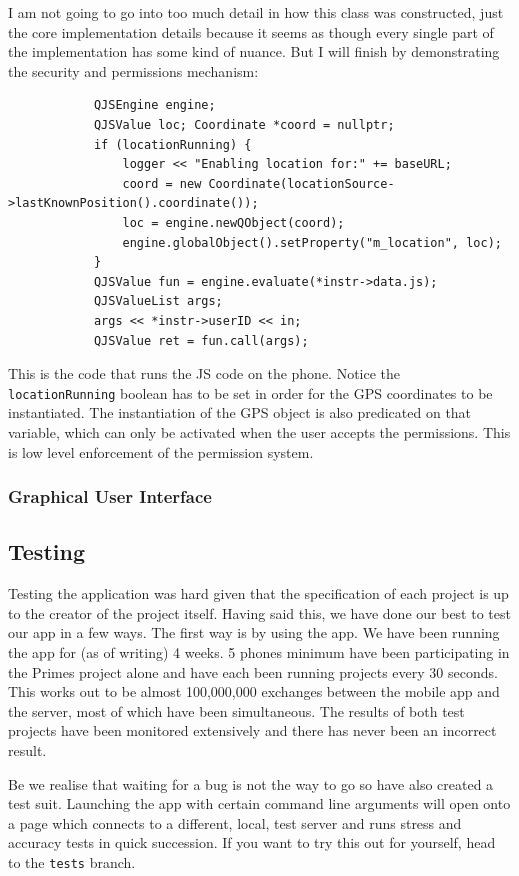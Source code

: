 \documentclass{article}
\begin{document}
I am not going to go into too much detail in how this class was constructed, just the core implementation details because it seems
as though every single part of the implementation has some kind of nuance. But I will finish by demonstrating the security and permissions
mechanism:
\begin{verbatim}
            QJSEngine engine;
            QJSValue loc; Coordinate *coord = nullptr;
            if (locationRunning) {
                logger << "Enabling location for:" += baseURL;
                coord = new Coordinate(locationSource->lastKnownPosition().coordinate());
                loc = engine.newQObject(coord);
                engine.globalObject().setProperty("m_location", loc);
            }
            QJSValue fun = engine.evaluate(*instr->data.js);
            QJSValueList args;
            args << *instr->userID << in;
            QJSValue ret = fun.call(args);
\end{verbatim}
This is the code that runs the JS code on the phone. Notice the \texttt{locationRunning} boolean has to be set in order for the
GPS coordinates to be instantiated. The instantiation of the GPS object is also predicated on that variable, which can only be activated
when the user accepts the permissions. This is low level enforcement of the permission system.

\subsubsection{Graphical User Interface}
\subsection{Testing}
Testing the application was hard given that the specification of each project is up to the creator of the project itself. Having said this,
we have done our best to test our app in a few ways. The first way is by using the app. We have been running the app for (as of writing)
4 weeks. 5 phones minimum have been participating in the Primes project alone and have each been running projects every 30 seconds.
This works out to be almost 100,000,000 exchanges between the mobile app and the server, most of which have been simultaneous. The results
of both test projects have been monitored extensively and there has never been an incorrect result.

Be we realise that waiting for a bug is not the way to go so have also created a test suit. Launching the app with certain command line
arguments will open onto a page which connects to a different, local, test server and runs stress and accuracy tests in quick succession.
If you want to try this out for yourself, head to the \texttt{tests} branch.
\end{document}

